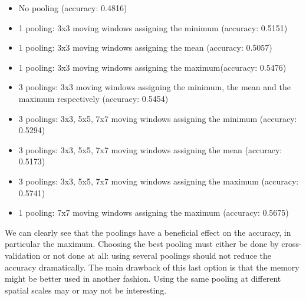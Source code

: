 \documentclass[a4paper]{report}
\begin{document}
	\begin{itemize}
		\item No pooling (accuracy: 0.4816)
		\item 1 pooling: 3x3 moving windows assigning the minimum (accuracy: 0.5151)
		\item 1 pooling: 3x3 moving windows assigning the mean (accuracy: 0.5057)
		\item 1 pooling: 3x3 moving windows assigning the maximum(accuracy: 0.5476)
		\item 3 poolings: 3x3 moving windows assigning the minimum, the mean and the maximum respectively (accuracy: 0.5454)
		\item 3 poolings: 3x3, 5x5, 7x7 moving windows assigning the minimum (accuracy: 0.5294)
		\item 3 poolings: 3x3, 5x5, 7x7 moving windows assigning the mean (accuracy: 0.5173)
		\item 3 poolings: 3x3, 5x5, 7x7 moving windows assigning the maximum (accuracy: 0.5741)
		\item 1 pooling: 7x7 moving windows assigning the maximum (accuracy: 0.5675)
	\end{itemize}
	We can clearly see that the poolings have a beneficial effect on the accuracy, in particular the maximum. %
	Choosing the best pooling must either be done by cross-validation or not done at all: using several poolings should not reduce the accuracy dramatically. The main drawback of this last option is that the memory might be better used in another fashion. Using the same pooling at different spatial scales may or may not be interesting.

	
\end{document}

